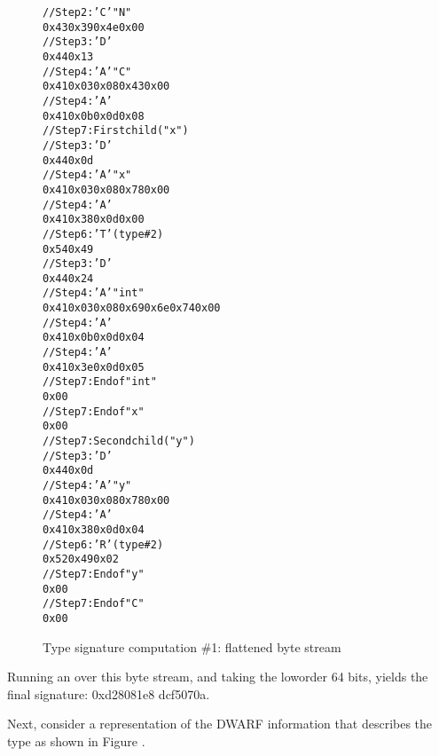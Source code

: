 \begin{figure}
\begin{dwflisting}
\begin{alltt}
// Step 2: 'C' \DWTAGnamespace "N"
0x43 0x39 0x4e 0x00
// Step 3: 'D' \DWTAGstructuretype
0x44 0x13
// Step 4: 'A' \DWATname \DWFORMstring "C"
0x41 0x03 0x08 0x43 0x00
// Step 4: 'A' \DWATbytesize {}
0x41 0x0b 0x0d 0x08
// Step 7: First child ("x")
    // Step 3: 'D' \DWTAGmember
    0x44 0x0d
    // Step 4: 'A' \DWATname \DWFORMstring "x"
    0x41 0x03 0x08 0x78 0x00
    // Step 4: 'A' \DWATdatamemberlocation {}
    0x41 0x38 0x0d 0x00
    // Step 6: 'T' \DWATtype (type \#2)
    0x54 0x49
        // Step 3: 'D' \DWTAGbasetype
        0x44 0x24
        // Step 4: 'A' \DWATname \DWFORMstring "int"
        0x41 0x03 0x08 0x69 0x6e 0x74 0x00
        // Step 4: 'A' \DWATbytesize {}
        0x41 0x0b 0x0d 0x04
        // Step 4: 'A' \DWATencoding \DWFORMsdata \DWATEsigned
        0x41 0x3e 0x0d 0x05
        // Step 7: End of \DWTAGbasetype "int"
        0x00
    // Step 7: End of \DWTAGmember "x"
    0x00
// Step 7: Second child ("y")
    // Step 3: 'D' \DWTAGmember
    0x44 0x0d
    // Step 4: 'A' \DWATname \DWFORMstring "y"
    0x41 0x03 0x08 0x78 0x00
    // Step 4: 'A' \DWATdatamemberlocation {}
    0x41 0x38 0x0d 0x04
    // Step 6: 'R' \DWATtype (type \#2)
    0x52 0x49 0x02
    // Step 7: End of \DWTAGmember "y"
    0x00
// Step 7: End of \DWTAGstructuretype "C"
0x00
\end{alltt}
\end{dwflisting}
\caption{Type signature computation \#1: flattened byte stream}
\label{fig:typesignaturecomputation1flattenedbytestream}
\end{figure}

Running an  over this byte stream, and taking the
low\dash order 64 bits, yields the final signature: 
0xd28081e8 dcf5070a.

Next, consider a representation of the DWARF information that
describes the type  as shown in 
Figure .

